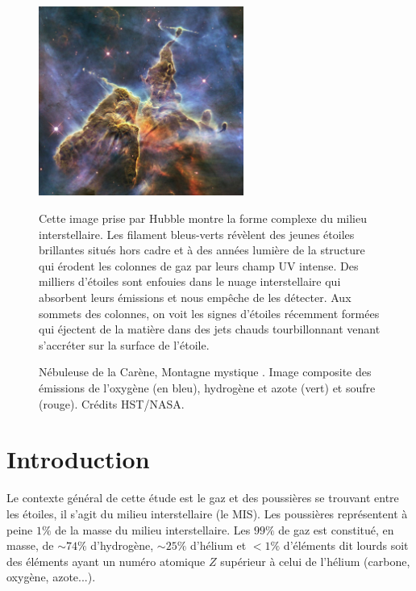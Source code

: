 \documentclass[11pt,a4paper,twoside,openright]{article}
\begin{document}
\begin{spacing}{0.98}
\begin{figure}[!p]
    \centering
    \includegraphics[width = 0.6\textwidth]{figure/mystic.pdf}
    \caption{Nébuleuse de la Carène, \og Montagne mystique \fg{}. Image composite des émissions de l’oxygène (en bleu), hydrogène et azote (vert) et soufre (rouge). Crédits HST/NASA.}
    \vspace{1em}
    \begin{minipage}{\textwidth}
    Cette image prise par Hubble montre la forme complexe du milieu interstellaire. Les filament bleus-verts révèlent des jeunes étoiles brillantes situés hors cadre et à des années lumière de la structure qui érodent les colonnes de gaz par leurs champ UV intense. Des milliers d'étoiles sont enfouies dans le nuage interstellaire qui absorbent leurs émissions et nous empêche de les détecter. Aux sommets des colonnes, on voit les signes d'étoiles récemment formées qui éjectent de la matière dans des jets chauds tourbillonnant venant s'accréter sur la surface de l'étoile.
    \end{minipage}
    \label{fig:intro:mystic}
\end{figure}
 
\newpage 
\section*{Introduction}


Le contexte général de cette étude est le gaz et des poussières se trouvant entre les étoiles, il s'agit du milieu interstellaire (le MIS). Les poussières représentent à peine $1\%$ de la masse du milieu interstellaire. Les $99\%$ de gaz est constitué, en masse, de $\sim 74\%$ d'hydrogène, $\sim 25\%$ d'hélium et $<1\%$ d'éléments dit \og lourds \fg{} soit des éléments ayant un numéro atomique $Z$ supérieur à celui de l'hélium (carbone, oxygène, azote...).\newline 


\end{spacing}
\end{document}
